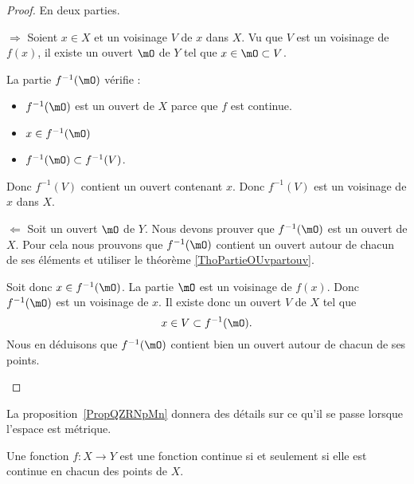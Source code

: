 \begin{proof}
    En deux parties.
    \begin{subproof}
    \item[\( \Rightarrow\)]
        Soient \( x\in X\) et un voisinage \( V\) de \( x\) dans \( X\). Vu que \( V\) est un voisinage de \( f(x)\), il existe un ouvert \( \mO\) de \( Y\) tel que \( x\in \mO\subset V\).

        La partie \( f^{-1}(\mO)\) vérifie :
        \begin{itemize}
            \item \( f^{-1}(\mO)\) est un ouvert de \( X\) parce que \( f\) est continue.
            \item \( x\in f^{-1}(\mO)\)
            \item \( f^{-1}(\mO)\subset f^{-1}(V)\).
        \end{itemize}
        Donc \( f^{-1}(V)\) contient un ouvert contenant \( x\). Donc \( f^{-1}(V)\) est un voisinage de \( x\) dans \( X\).
    \item[\( \Leftarrow\)]
        Soit un ouvert \( \mO\) de \( Y\). Nous devons prouver que \( f^{-1}(\mO)\) est un ouvert de \( X\). Pour cela nous prouvons que \( f^{-1}(\mO)\) contient un ouvert autour de chacun de ses éléments et utiliser le théorème \ref{ThoPartieOUvpartouv}.

        Soit donc \( x\in f^{-1}(\mO)\). La partie \( \mO\) est un voisinage de \( f(x)\). Donc \( f^{-1}(\mO)\) est un voisinage de \( x\). Il existe donc un ouvert \( V\) de \( X\) tel que
        \begin{equation}
            x\in V\subset f^{-1}(\mO).
        \end{equation}
        Nous en déduisons que \( f^{-1}(\mO)\) contient bien un ouvert autour de chacun de ses points.
    \end{subproof}
\end{proof}

La proposition~\ref{PropQZRNpMn} donnera des détails sur ce qu'il se passe lorsque l'espace est métrique.

\begin{theorem} \label{ThoESCaraB}
    Une fonction \( f\colon X\to Y\) est une fonction continue si et seulement si elle est continue en chacun des points de \( X\).
\end{theorem}

